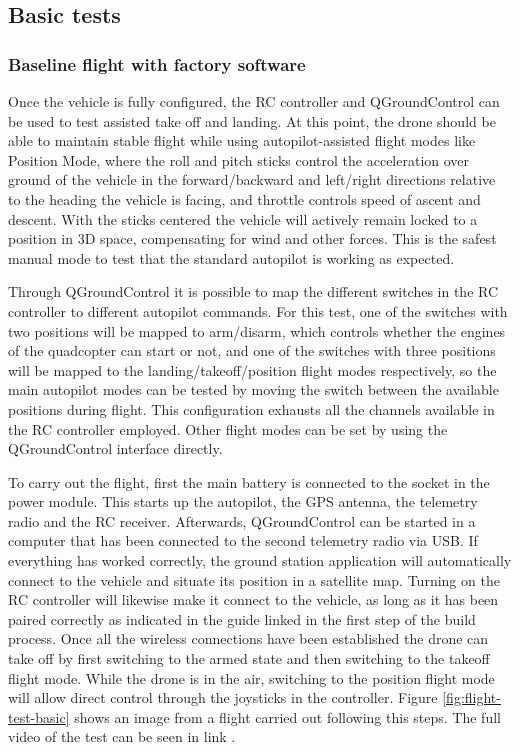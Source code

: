 \subsection{Basic tests}
\label{sec:test-8-flight}


\subsubsection{Baseline flight with factory software}
\label{subsec:fl-test-1}

Once the vehicle is fully configured, the RC controller and QGroundControl can be used to test assisted take off and landing.
At this point, the drone should be able to maintain stable flight while using autopilot-assisted flight modes like Position Mode, where the roll and pitch sticks control the acceleration over ground of the vehicle in the forward/backward and left/right directions relative to the heading the vehicle is facing, and throttle controls speed of ascent and descent. 
With the sticks centered the vehicle will actively remain locked to a position in 3D space, compensating for wind and other forces.
This is the safest manual mode to test that the standard autopilot is working as expected.

Through QGroundControl it is possible to map the different switches in the RC controller to different autopilot commands.
For this test, one of the switches with two positions will be mapped to arm/disarm, which controls whether the engines of the quadcopter can start or not, and one of the switches with three positions will be mapped to the landing/takeoff/position flight modes respectively, so the main autopilot modes can be tested by moving the switch between the available positions during flight.
This configuration exhausts all the channels available in the RC controller employed.
Other flight modes can be set by using the QGroundControl interface directly.

To carry out the flight, first the main battery is connected to the socket in the power module.
This starts up the autopilot, the GPS antenna, the telemetry radio and the RC receiver.
Afterwards, QGroundControl can be started in a computer that has been connected to the second telemetry radio via USB.
If everything has worked correctly, the ground station application will automatically connect to the vehicle and situate its position in a satellite map.
Turning on the RC controller will likewise make it connect to the vehicle, as long as it has been paired correctly as indicated in the guide linked in the first step of the build process.
Once all the wireless connections have been established the drone can take off by first switching to the armed state and then switching to the takeoff flight mode.
While the drone is in the air, switching to the position flight mode will allow direct control through the joysticks in the controller.
Figure \ref{fig:flight-test-basic} shows an image from a flight carried out following this steps.
The full video of the test can be seen in link .

